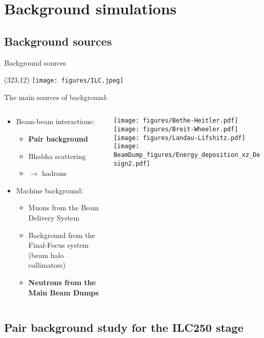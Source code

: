 \documentclass[xcolor={dvipsnames}]{beamer}
\newcommand{\ilclogo}{
  \setlength{\TPHorizModule}{1pt}
  \setlength{\TPVertModule}{1pt}
  \begin{textblock}{1}(323,12)
   \texttt{[image: figures/ILC.jpeg]}
  \end{textblock}
}
\begin{document}
\section{Background simulations}
\subsection{Background sources}

\begin{frame}{Background sources}
\ilclogo
The main sources of background:
\begin{columns}
 \begin{column}{0.6\textwidth}
  \begin{itemize}
    \item Beam-beam interactions:
    \begin{itemize}
      \item \textbf{Pair background}
      \item Bhabha scattering
      \item \textgamma \textgamma $\rightarrow$ hadrons
    \end{itemize}
    \vspace*{0.5cm}
    \item Machine background:
    \begin{itemize}
      \item Muons from the Beam Delivery System
      \item Background from the Final-Focus system (beam halo collimators)
      \item \textbf{Neutrons from the Main Beam Dumps}
    \end{itemize}
  \end{itemize}
 \end{column}
 \begin{column}{0.45\textwidth}
 \texttt{[image: figures/Bethe-Heitler.pdf]}
 \texttt{[image: figures/Breit-Wheeler.pdf]}\\
 \texttt{[image: figures/Landau-Lifshitz.pdf]}
 \vspace*{0.5cm}
 \texttt{[image: BeamDump\_figures/Energy\_deposition\_xz\_Design2.pdf]}
 \end{column}
\end{columns}
\end{frame}

\subsection{Pair background study for the ILC250 stage}
\end{document}
